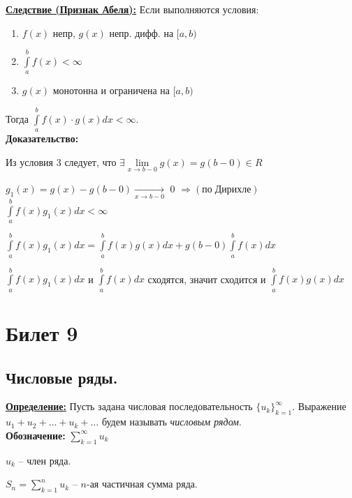 \documentclass[a4paper,12pt]{article} %
\newcommand{\useries}{\sum\limits_{k=1}^{\infty} u_k}
\newcommand{\sn}{\sum\limits_{k=1}^{n} u_k}
\begin{document}
\underline{\textbf{Следствие (Признак Абеля):}} Если выполняются условия:

\begin{enumerate}
    \item $f(x)$ непр, $g(x)$ непр. дифф. на $[a, b)$
    
    \item $\int\limits_{a}^{b}f(x) < \infty$
    
    \item $g(x)$ монотонна и ограничена на $[a, b)$ 

\end{enumerate}

Тогда $\int\limits_a^b f(x)\cdot g(x) dx < \infty$.\\

\textbf{Доказательство:}

Из условия $3$ следует, что $\exists\lim\limits_{x\rightarrow b-0}g(x) = g(b-0) \in R$

$g_1(x) = g(x) - g(b-0) \xrightarrow[x \to b-0]{}$ 0 $\Rightarrow(по\; Дирихле)$ $\int\limits_a^b f(x)g_1(x) dx < \infty$

$\int\limits_a^b f(x)g_1(x)dx = \int\limits_a^b f(x)g(x)dx+g(b-0)\int\limits_a^b f(x)dx$

$\int\limits_a^b f(x)g_1(x)dx$ и $\int\limits_a^b f(x)dx$ сходятся, значит сходится и $\int\limits_a^b f(x)g(x)dx$




\newpage
\section{Билет 9}

\subsection{Числовые ряды.}

\underline{\textbf{Определение:}}
Пусть задана числовая последовательность $\{{u_k}\}_{k=1}^{\infty}$. Выражение $u_1 + u_2 + \ldots + u_k + \ldots$ будем называть \textit{числовым рядом}.\\

\textbf{Обозначение:} $\useries$

$u_k$ -- член ряда.

$S_n = \sn$ -- $n$-ая частичная сумма ряда.\\
\end{document}
